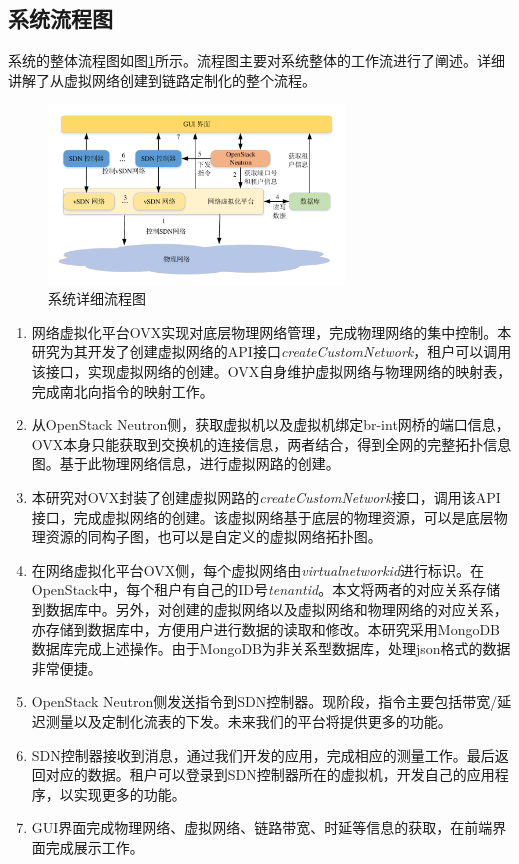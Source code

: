 \subsection{系统流程图}
系统的整体流程图如图\ref{fig:workflow}所示。流程图主要对系统整体的工作流进行了阐述。详细讲解了从虚拟网络创建到链路定制化的整个流程。

\begin{figure}[!htb]
  \centering
  \includegraphics[width=0.7\textwidth]{logo/workflow}
  \caption{系统详细流程图}
  \label{fig:workflow}
\end{figure}

\begin{enumerate}
\item 网络虚拟化平台OVX实现对底层物理网络管理，完成物理网络的集中控制。本研究为其开发了创建虚拟网络的API接口\emph{createCustomNetwork}，租户可以调用该接口，实现虚拟网络的创建。OVX自身维护虚拟网络与物理网络的映射表，完成南北向指令的映射工作。
\item 从OpenStack Neutron侧，获取虚拟机以及虚拟机绑定br-int网桥的端口信息，OVX本身只能获取到交换机的连接信息，两者结合，得到全网的完整拓扑信息图。基于此物理网络信息，进行虚拟网路的创建。
\item 本研究对OVX封装了创建虚拟网路的\emph{createCustomNetwork}接口，调用该API接口，完成虚拟网络的创建。该虚拟网络基于底层的物理资源，可以是底层物理资源的同构子图，也可以是自定义的虚拟网络拓扑图。
\item 在网络虚拟化平台OVX侧，每个虚拟网络由\emph{virtualnetworkid}进行标识。在OpenStack中，每个租户有自己的ID号\emph{tenantid}。本文将两者的对应关系存储到数据库中。另外，对创建的虚拟网络以及虚拟网络和物理网络的对应关系，亦存储到数据库中，方便用户进行数据的读取和修改。本研究采用MongoDB数据库完成上述操作。由于MongoDB为非关系型数据库，处理json格式的数据非常便捷。
\item OpenStack Neutron侧发送指令到SDN控制器。现阶段，指令主要包括带宽/延迟测量以及定制化流表的下发。未来我们的平台将提供更多的功能。
\item SDN控制器接收到消息，通过我们开发的应用，完成相应的测量工作。最后返回对应的数据。租户可以登录到SDN控制器所在的虚拟机，开发自己的应用程序，以实现更多的功能。
\item GUI界面完成物理网络、虚拟网络、链路带宽、时延等信息的获取，在前端界面完成展示工作。
\end{enumerate}


